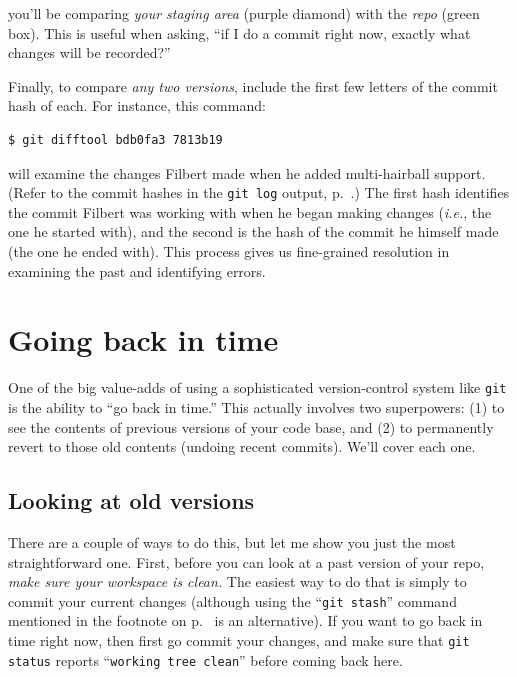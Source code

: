 you'll be comparing \textit{your staging area} (purple diamond) with the
\textit{repo} (green box). This is useful when asking, ``if I do a commit
right now, exactly what changes will be recorded?''

\medskip
{}
Finally, to compare \textit{any two versions}, include the first few letters
of the commit hash of each. For instance, this command:

\begin{Verbatim}[fontsize=\small,samepage=true,frame=none]
$ git difftool bdb0fa3 7813b19
\end{Verbatim}

will examine the changes Filbert made when he added multi-hairball support.
(Refer to the commit hashes in the \texttt{git log} output,
p.~\pageref{gitLogOutput}.) The first hash identifies the commit Filbert was
working with when he began making changes (\textit{i.e.}, the one he started
with), and the second is the hash of the commit he himself made (the one he
ended with). This process gives us fine-grained resolution in examining the
past and identifying errors.

\section{Going back in time}


One of the big value-adds of using a sophisticated version-control system like
\texttt{git} is the ability to ``go back in time.'' This actually involves two
superpowers: (1) to see the contents of previous versions of your code base,
and (2) to permanently revert to those old contents (undoing recent commits).
We'll cover each one.

\subsection{Looking at old versions}

There are a couple of ways to do this, but let me show you just the most
straightforward one. First, before you can look at a past version of your repo,
\textit{make sure your workspace is clean.} The easiest way to do that is
simply to commit your current changes (although using the ``\texttt{git
stash}'' command mentioned in the footnote on p.~\pageref{gitStash} is an
alternative). If you want to go back in time right now, then first go commit
your changes, and make sure that \texttt{git status} reports ``\texttt{working
tree clean}'' before coming back here.

